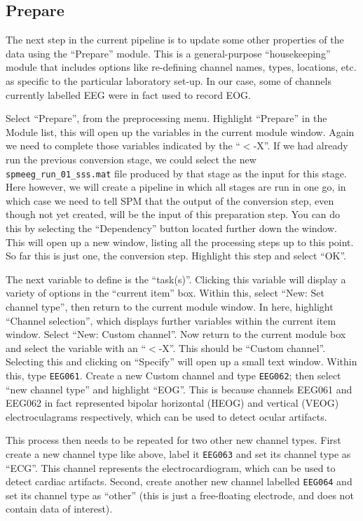 \subsection{Prepare}

The next step in the current pipeline is to update some other properties of the data using the ``Prepare'' module. This is a general-purpose ``housekeeping'' module that includes options like re-defining channel names, types, locations, etc. as specific to the particular laboratory set-up. In our case, some of channels currently labelled EEG were in fact used to record EOG.

Select ``Prepare'', from the preprocessing menu. Highlight ``Prepare'' in the Module list, this will open up the variables in the current module window. Again we need to complete those variables indicated by the ``\(<\)-X''. If we had already run the previous conversion stage, we could select the new \texttt{spmeeg\_run\_01\_sss.mat} file produced by that stage as the input for this stage. Here however, we will create a pipeline in which all stages are run in one go, in which case we need to tell SPM that the output of the conversion step, even though not yet created, will be the input of this preparation step. You can do this by selecting the ``Dependency'' button located further down the window. This will open up a new window, listing all the processing steps up to this point. So far this is just one, the conversion step. Highlight this step and select ``OK''.

The next variable to define is the ``task(s)''. Clicking this variable will display a variety of options in the ``current item'' box. Within this, select ``New: Set channel type'', then return to the current module window. In here, highlight ``Channel selection'', which displays further variables within the current item window. Select ``New: Custom channel''. Now return to the current module box and select the variable with an ``\(<\)-X''. This should be ``Custom channel''. Selecting this and clicking on ``Specify'' will open up a small text window. Within this, type \texttt{EEG061}. Create a new Custom channel and type \texttt{EEG062}; then select ``new channel type'' and highlight ``EOG''. This is because channels EEG061 and EEG062 in fact represented bipolar horizontal (HEOG) and vertical (VEOG) electroculagrams respectively, which can be used to detect ocular artifacts.

This process then needs to be repeated for two other new channel types. First create a new channel type like above, label it \texttt{EEG063} and set its channel type as ``ECG''. This channel represents the electrocardiogram, which can be used to detect cardiac artifacts. Second, create another new channel labelled \texttt{EEG064} and set its channel type as ``other'' (this is just a free-floating electrode, and does not contain data of interest).

